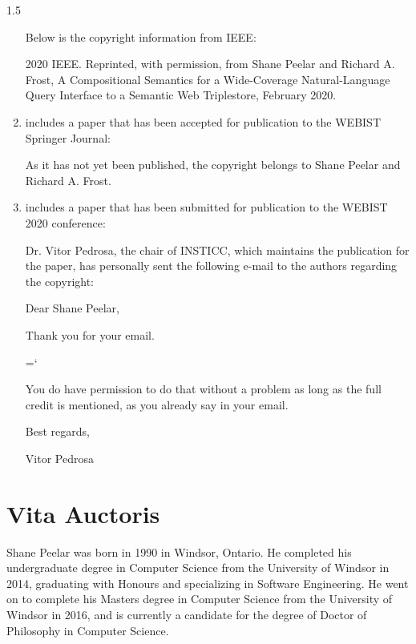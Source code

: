 \documentclass[fleqn, oneside, 12pt]{book}
\theoremstyle{definitionsty}
\newcommand{\uwinonehalfspacelen}{1.5}
\newcommand{\uwindefaultspacelen}{\uwinonehalfspacelen}
\newenvironment{uwindefaultspaceenv}%
{\begin{spacing}{\uwindefaultspacelen}}%
	{\end{spacing}}
\begin{document}
\begin{uwindefaultspaceenv}
\begin{enumerate}
{		

		Below is the copyright information from IEEE:

		2020 IEEE. Reprinted, with permission, from Shane Peelar and Richard A. Frost, A Compositional Semantics for a Wide-Coverage Natural-Language Query Interface to a Semantic Web Triplestore, February 2020.}

	\item { includes a paper that has been accepted for publication to the WEBIST Springer Journal:


    As it has not yet been published, the copyright belongs to Shane Peelar and Richard A. Frost.
    }

	\item { includes a paper that has been submitted for publication to the WEBIST 2020 conference:


   	Dr. Vitor Pedrosa, the chair of INSTICC, which maintains the publication for the paper, has personally sent the following e-mail to the authors regarding the copyright:

    { \ttfamily
    Dear Shane Peelar,

    Thank you for your email.

    \hyphenchar\font=`\-%

    You do have permission to do that without a problem as long as the full credit is mentioned, as you already say in your email.


    Best regards,

    Vitor Pedrosa

    }

    }
\end{enumerate}








\chapter*{Vita Auctoris}

Shane Peelar was born in 1990 in Windsor, Ontario.  He completed his undergraduate degree in Computer Science from the University of Windsor in 2014, graduating with Honours and specializing in Software Engineering.  He went on to complete his Masters degree in Computer Science from the University of Windsor in 2016, and is currently a candidate for the degree of Doctor of Philosophy in Computer Science.

\end{uwindefaultspaceenv}
\end{document}
